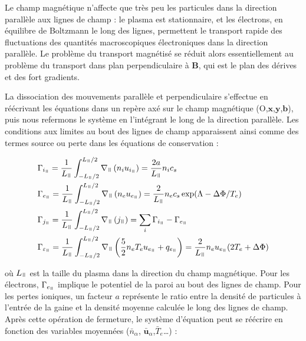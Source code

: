 \begin{refsection}
Le champ magnétique n'affecte que très peu les particules dans la direction
parallèle aux lignes de champ : le plasma est stationnaire, et les électrons, en
équilibre de Boltzmann le long des lignes, permettent le transport rapide des fluctuations des quantités
macroscopiques électroniques dans la direction parallèle. Le problème du
transport magnétisé se réduit alors essentiellement au problème du transport
dans plan perpendiculaire à $\mathbf B$, qui est le plan des dérives et des
fort gradients.

La dissociation des mouvements parallèle et perpendiculaire s'effectue
en réécrivant les équations dans un repère axé sur le champ magnétique
(O,$\mathbf x$,$\mathbf y$,$\mathbf b$), puis nous refermons le
système en l'intégrant le long de la direction parallèle. Les conditions aux
limites au bout des lignes de champ apparaissent ainsi comme des termes source
ou perte dans les équations de conservation :

\begin{align}
\label{3-vitessesBord}
\begin{split}
\Gamma&_{i_\para}=\frac{1}{L_\para}\int_{-L_\para/2}^{L_\para/2}\nabla_\para\left(n_iu_{i_\para}\right)=\frac{2a}{L_\para}n_ic_s\\
\Gamma&_{e_\para}=\frac{1}{L_\para}\int_{-L_\para/2}^{L_\para/2}\nabla_\para\left(n_eu_{e_\para}\right)=\frac{2}{L_\para}n_ec_s
\exp(\Lambda-\Delta \Phi/T_e)\\
\Gamma&_{j_\para}=\frac{1}{L_\para}\int_{-L_\para/2}^{L_\para/2}\nabla_\para\left(j_\para\right)=\sum_i\Gamma_{i_\para}-\Gamma_{e_\para}\\
\Gamma&_{\varepsilon_\para}=\frac{1}{L_\para}
\int_{-L_\para/2}^{L_\para/2}\nabla_\para
\left(\frac{5}{2}n_eT_eu_{e_\para}+q_{e_\para}\right)
=\frac{2}{L_\para}n_eu_{e_\para}(2T_e+\Delta \Phi)
\end{split}
\end{align}

où $L_\para$ est la taille du plasma dans la direction du champ magnétique. Pour
les électrons, $\Gamma_{e_\para}$ implique le potentiel de la paroi au bout des
lignes de champ. Pour les pertes ioniques, un facteur $a$ représente le ratio
entre la densité de particules à l'entrée de la gaine et la densité moyenne
calculée le long des lignes de champ. Après cette opération de fermeture,
le système d'équation peut se réécrire en fonction des variables moyennées
($\bar{n}_\alpha$, $\bar{\mathbf u}_\alpha$,$\bar{T}_e$\ldots) :


\end{refsection}
